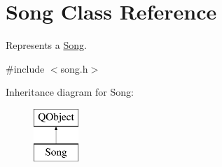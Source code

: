 \hypertarget{class_song}{}\section{Song Class Reference}
\label{class_song}


Represents a \mbox{\hyperlink{class_song}{Song}}.  




{\ttfamily \#include $<$song.\+h$>$}

Inheritance diagram for Song\+:\begin{figure}[H]
\begin{center}
\leavevmode
\includegraphics[height=2.000000cm]{da/dc3/class_song}
\end{center}
\end{figure}
